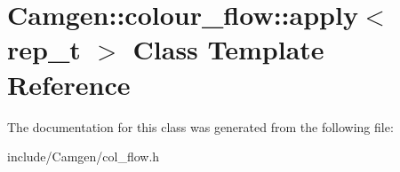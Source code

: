 \hypertarget{a00014}{}\section{Camgen\+:\+:colour\+\_\+flow\+:\+:apply$<$ rep\+\_\+t $>$ Class Template Reference}
\label{a00014}


The documentation for this class was generated from the following file\+:\begin{DoxyCompactItemize}
\item 
include/\+Camgen/col\+\_\+flow.\+h\end{DoxyCompactItemize}

